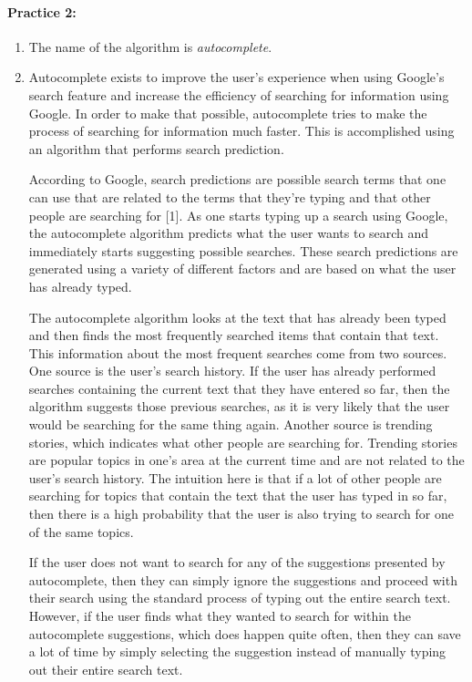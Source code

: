 \documentclass[12pt]{article}
\begin{document}
\paragraph{Practice 2:}
    \begin{enumerate}
    \item The name of the algorithm is \textit{autocomplete}.
    \item Autocomplete exists to improve the user's experience when using Google's search feature and increase the efficiency of searching for information using Google. In order to make that possible, autocomplete tries to make the process of searching for information much faster. This is accomplished using an algorithm that performs search prediction.

    \qquad According to Google, search predictions are possible search terms that one can use that are related to the terms that they're typing and that other people are searching for [1]. As one starts typing up a search using Google, the autocomplete algorithm predicts what the user wants to search and immediately starts suggesting possible searches. These search predictions are generated using a variety of different factors and are based on what the user has already typed.

    \qquad The autocomplete algorithm looks at the text that has already been typed and then finds the most frequently searched items that contain that text. This information about the most frequent searches come from two sources. One source is the user's search history. If the user has already performed searches containing the current text that they have entered so far, then the algorithm suggests those previous searches, as it is very likely that the user would be searching for the same thing again. Another source is trending stories, which indicates what other people are searching for. Trending stories are popular topics in one's area at the current time and are not related to the user's search history. The intuition here is that if a lot of other people are searching for topics that contain the text that the user has typed in so far, then there is a high probability that the user is also trying to search for one of the same topics.

    \qquad If the user does not want to search for any of the suggestions presented by autocomplete, then they can simply ignore the suggestions and proceed with their search using the standard process of typing out the entire search text. However, if the user finds what they wanted to search for within the autocomplete suggestions, which does happen quite often, then they can save a lot of time by simply selecting the suggestion instead of manually typing out their entire search text.


\end{enumerate}
\end{document}
